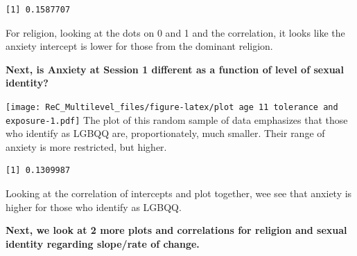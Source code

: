 \documentclass[
  english,
]{book}
\newenvironment{Shaded}{\begin{snugshade}}{\end{snugshade}}
\newcommand{\AttributeTok}[1]{\textcolor[rgb]{0.77,0.63,0.00}{#1}}
\newcommand{\FunctionTok}[1]{\textcolor[rgb]{0.00,0.00,0.00}{#1}}
\newcommand{\NormalTok}[1]{#1}
\newcommand{\SpecialCharTok}[1]{\textcolor[rgb]{0.00,0.00,0.00}{#1}}
\newcommand{\StringTok}[1]{\textcolor[rgb]{0.31,0.60,0.02}{#1}}
\begin{document}
\begin{verbatim}
[1] 0.1587707
\end{verbatim}

For religion, looking at the dots on 0 and 1 and the correlation, it looks like the anxiety intercept is lower for those from the dominant religion.

\textbf{Next, is Anxiety at Session 1 different as a function of level of sexual identity?}

\begin{Shaded}
\end{Shaded}

\texttt{[image: ReC\_Multilevel\_files/figure-latex/plot age 11 tolerance and exposure-1.pdf]}
The plot of this random sample of data emphasizes that those who identify as LGBQQ are, proportionately, much smaller. Their range of anxiety is more restricted, but higher.

\begin{Shaded}
\end{Shaded}

\begin{verbatim}
[1] 0.1309987
\end{verbatim}

Looking at the correlation of intercepts and plot together, wee see that anxiety is higher for those who identify as LGBQQ.

\textbf{Next, we look at 2 more plots and correlations for religion and sexual identity regarding slope/rate of change.}

\begin{Shaded}
\end{Shaded}
\end{document}
